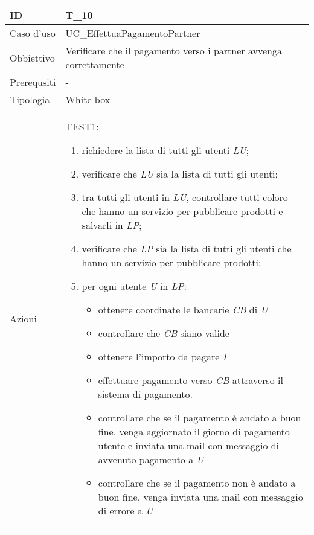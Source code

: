\begin{table}[hb]
    \centering
    \begin{tabular}{ |p{2cm}|p{10cm}|  }
        \hline
        ID & T\_10 \\\hline
        Caso d'uso & UC\_EffettuaPagamentoPartner \\\hline   
        Obbiettivo & Verificare che il pagamento verso i partner avvenga correttamente \\\hline
        Prerequsiti & - \\\hline
        Tipologia & White box \\\hline
        Azioni & 
        TEST1:
        \begin{enumerate}[topsep=0pt]
            \item richiedere la lista di tutti gli utenti \emph{LU};
            \item verificare che \emph{LU} sia la lista di tutti gli utenti;
            \item tra tutti gli utenti in \emph{LU}, controllare tutti coloro che 
            hanno un servizio per pubblicare prodotti e salvarli in \emph{LP};
            \item verificare che \emph{LP} sia la lista di tutti gli utenti che
            hanno un servizio per pubblicare prodotti;
            \item per ogni utente \emph{U} in \emph{LP}:
            \begin{itemize}
                \item ottenere coordinate le bancarie \emph{CB} di \emph{U}
                \item controllare che \emph{CB} siano valide
                \item ottenere l'importo da pagare \emph{I}
                \item effettuare pagamento verso \emph{CB} attraverso il sistema
                di pagamento.
                \item controllare che se il pagamento è andato a buon fine, venga aggiornato il giorno di 
                pagamento utente e inviata una mail con messaggio di avvenuto pagamento a \emph{U}
                \item controllare che se il pagamento non è andato a buon fine, venga inviata una mail
                con messaggio di errore a \emph{U}
            \end{itemize}

        \end{enumerate}
        \\\hline
    \end{tabular}
\end{table}


